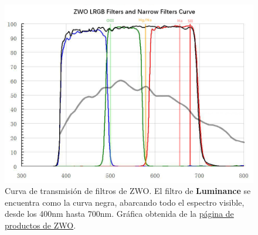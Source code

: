 \begin{figure}[!ht]
	\centering
	\includegraphics[scale=0.6]{Observaciones/Secciones/Figures/ZWO RGBL Transmission Curve.jpg}
	\caption{Curva de transmisión de filtros de ZWO. El filtro de
	\textbf{Luminance} se encuentra como la curva negra, abarcando todo el
	espectro visible, desde los 400nm hasta 700nm. Gráfica obtenida de la
	\href{https://astronomy-imaging-camera.com/product/zwo-lrgb-36mm-filters/}{página
	de productos de ZWO}.}
	\label{zwoFilterTransmissionCurve}
\end{figure}